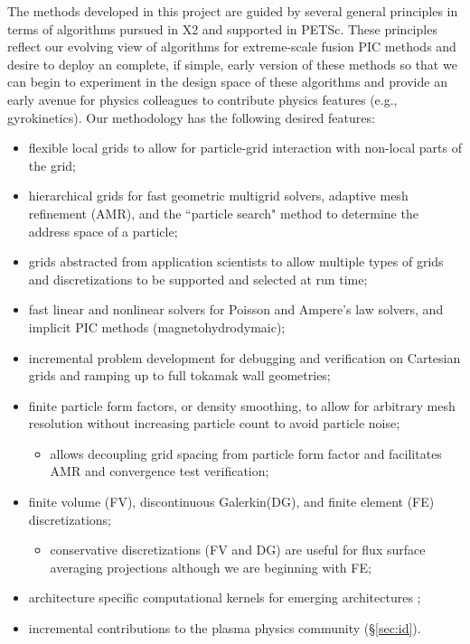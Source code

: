 \documentclass[review]{siamart}
\begin{document}
The methods developed in this project are guided by several general principles in terms of algorithms pursued in X2 and supported in PETSc.
These principles reflect our evolving view of algorithms for extreme-scale fusion PIC methods and desire to deploy an complete, if simple, early version of these methods so that we can begin to experiment in the design space of these algorithms and provide an early avenue for physics colleagues to contribute physics features (e.g., gyrokinetics).
Our methodology has the following desired features:
\begin{itemize}
\item flexible local grids to allow for particle-grid interaction with non-local parts of the grid;
\item hierarchical grids for fast geometric multigrid solvers, adaptive mesh refinement (AMR), and the ``particle search" method to determine the address space of a particle;
\item grids abstracted from application scientists to allow multiple types of grids and discretizations to be supported and selected at run time;
\item fast linear and nonlinear solvers for Poisson and Ampere's law solvers, and implicit PIC methods (magnetohydrodymaic);
\item incremental problem development for debugging and verification on Cartesian grids and ramping up to full tokamak wall geometries;
\item finite particle form factors, or density smoothing, to allow for arbitrary mesh resolution without increasing particle count to avoid particle noise;
\begin{itemize}
\item allows decoupling grid spacing from particle form factor and facilitates AMR and convergence test verification;
\end{itemize}
\item finite volume (FV), discontinuous Galerkin(DG), and finite element (FE) discretizations;
\begin{itemize}
\item conservative discretizations (FV and DG) are useful for flux surface averaging projections although we are beginning with FE;
\end{itemize}
\item architecture specific computational kernels for emerging architectures \cite{KnepleyBrownMcInnesSmithRuppAdams2015};
\item incremental contributions to the plasma physics community (\S\ref{sec:id}).
\end{itemize}
\end{document}
